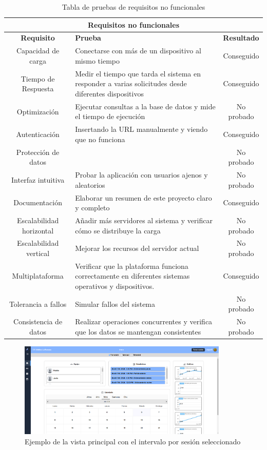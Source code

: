 \begin{table}[H]
\centering
\begin{tabularx}{\textwidth}{|c|X|c|}
\hline
\multicolumn{3}{|c|}{\textbf{Requisitos no funcionales}} \\ \hline
\textbf{Requisito} & \textbf{Prueba} & \textbf{Resultado} \\ \hline
Capacidad de carga & Conectarse con más de un dispositivo al mismo tiempo & Conseguido \\ \hline
Tiempo de Respuesta & Medir el tiempo que tarda el sistema en responder a varias solicitudes desde diferentes dispositivos & Conseguido \\ \hline
Optimización & Ejecutar consultas a la base de datos y mide el tiempo de ejecución & No probado \\ \hline
Autenticación & Insertando la URL manualmente y viendo que no funciona & Conseguido \\ \hline
Protección de datos &  & No probado \\ \hline
Interfaz intuitiva & Probar la aplicación con usuarios ajenos y aleatorios & No probado \\ \hline
Documentación & Elaborar un resumen de este proyecto claro y completo & Conseguido \\ \hline
Escalabilidad horizontal & Añadir más servidores al sistema y verificar cómo se distribuye la carga & No probado \\ \hline
Escalabilidad vertical & Mejorar los recursos del servidor actual & No probado \\ \hline
Multiplataforma & Verificar que la plataforma funciona correctamente en diferentes sistemas operativos y dispositivos. & Conseguido \\ \hline
Tolerancia a fallos & Simular fallos del sistema & No probado \\ \hline
Consistencia de datos & Realizar operaciones concurrentes y verifica que los datos se mantengan consistentes & No probado \\ \hline
\end{tabularx}
\caption{Tabla de pruebas de requisitos no funcionales} \label{tab:pruebas_nofunc}
\end{table}

\begin{figure}[H]
    \centering
    \includegraphics[width=10cm]{archivos/tfg_jorge/pruebas/home_sesion}
    \caption{Ejemplo de la vista principal con el intervalo por sesión seleccionado}\label{sistemass2}
\end{figure}

